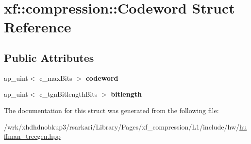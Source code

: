 \hypertarget{structxf_1_1compression_1_1Codeword}{\section{xf\-:\-:compression\-:\-:Codeword Struct Reference}
\label{structxf_1_1compression_1_1Codeword}
}
\subsection*{Public Attributes}
\begin{DoxyCompactItemize}
\item 
\hypertarget{structxf_1_1compression_1_1Codeword_a6045eb37d7c73f8a4ea0e644fc151662}{ap\-\_\-uint$<$ c\-\_\-max\-Bits $>$ {\bfseries codeword}}\label{structxf_1_1compression_1_1Codeword_a6045eb37d7c73f8a4ea0e644fc151662}

\item 
\hypertarget{structxf_1_1compression_1_1Codeword_a1833cbef40b9839df77d45984b6879f1}{ap\-\_\-uint$<$ c\-\_\-tgn\-Bitlength\-Bits $>$ {\bfseries bitlength}}\label{structxf_1_1compression_1_1Codeword_a1833cbef40b9839df77d45984b6879f1}

\end{DoxyCompactItemize}


The documentation for this struct was generated from the following file\-:\begin{DoxyCompactItemize}
\item 
/wrk/xhdhdnobkup3/rsarkari/\-Library/\-Pages/xf\-\_\-compression/\-L1/include/hw/\hyperlink{huffman__treegen_8hpp}{huffman\-\_\-treegen.\-hpp}\end{DoxyCompactItemize}
